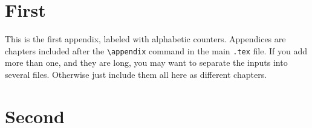 \chapter{First}
This is the first appendix, labeled with alphabetic counters. Appendices are chapters included after the \verb|\appendix| command in the main \texttt{.tex} file. If you add more than one, and they are long, you may want to separate the inputs into several files. Otherwise just include them all here as different chapters.

\chapter{Second}
